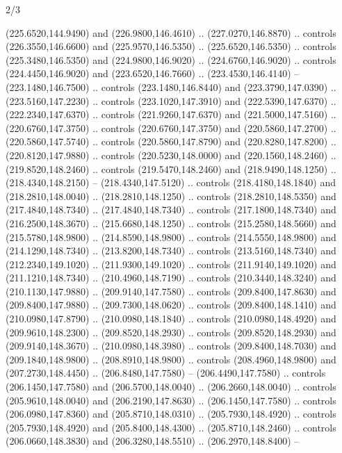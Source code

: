 \begin{flagdescription}{2/3}
\begin{scope}[xshift=0.5\flaglength,yshift=0.5\flagwidth,scale=\flagwidth/259.2]
\begin{scope}[y=0.8pt, x=0.8pt, yscale=-1,shift={(-243,-162)}]
      (225.6520,144.9490) and (226.9800,146.4610) .. (227.0270,146.8870) .. controls
      (226.3550,146.6600) and (225.9570,146.5350) .. (225.6520,146.5350) .. controls
      (225.3480,146.5350) and (224.9800,146.9020) .. (224.6760,146.9020) .. controls
      (224.4450,146.9020) and (223.6520,146.7660) .. (223.4530,146.4140) --
      (223.1480,146.7500) .. controls (223.1480,146.8440) and (223.3790,147.0390) ..
      (223.5160,147.2230) .. controls (223.1020,147.3910) and (222.5390,147.6370) ..
      (222.2340,147.6370) .. controls (221.9260,147.6370) and (221.5000,147.5160) ..
      (220.6760,147.3750) .. controls (220.6760,147.3750) and (220.5860,147.2700) ..
      (220.5860,147.5740) .. controls (220.5860,147.8790) and (220.8280,147.8200) ..
      (220.8120,147.9880) .. controls (220.5230,148.0000) and (220.1560,148.2460) ..
      (219.8520,148.2460) .. controls (219.5470,148.2460) and (218.9490,148.1250) ..
      (218.4340,148.2150) -- (218.4340,147.5120) .. controls (218.4180,148.1840) and
      (218.2810,148.0040) .. (218.2810,148.1250) .. controls (218.2810,148.5350) and
      (217.4840,148.7340) .. (217.4840,148.7340) .. controls (217.1800,148.7340) and
      (216.2500,148.3670) .. (215.6680,148.1250) .. controls (215.2580,148.5660) and
      (215.5780,148.9800) .. (214.8590,148.9800) .. controls (214.5550,148.9800) and
      (214.1290,148.7340) .. (213.8200,148.7340) .. controls (213.5160,148.7340) and
      (212.2340,149.1020) .. (211.9300,149.1020) .. controls (211.9140,149.1020) and
      (211.1210,148.7340) .. (210.4960,148.7190) .. controls (210.3440,148.3240) and
      (210.1130,147.9880) .. (209.9140,147.7580) .. controls (209.8400,147.8630) and
      (209.8400,147.9880) .. (209.7300,148.0620) .. controls (209.8400,148.1410) and
      (210.0980,147.8790) .. (210.0980,148.1840) .. controls (210.0980,148.4920) and
      (209.9610,148.2300) .. (209.8520,148.2930) .. controls (209.8520,148.2930) and
      (209.9140,148.3670) .. (210.0980,148.3980) .. controls (209.8400,148.7030) and
      (209.1840,148.9800) .. (208.8910,148.9800) .. controls (208.4960,148.9800) and
      (207.2730,148.4450) .. (206.8480,147.7580) -- (206.4490,147.7580) .. controls
      (206.1450,147.7580) and (206.5700,148.0040) .. (206.2660,148.0040) .. controls
      (205.9610,148.0040) and (206.2190,147.8630) .. (206.1450,147.7580) .. controls
      (206.0980,147.8360) and (205.8710,148.0310) .. (205.7930,148.4920) .. controls
      (205.7930,148.4920) and (205.8400,148.4300) .. (205.8710,148.2460) .. controls
      (206.0660,148.3830) and (206.3280,148.5510) .. (206.2970,148.8400) --

\end{scope}
\end{scope}
\end{flagdescription}
